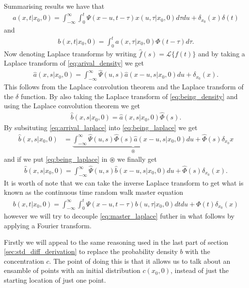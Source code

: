 Summarising results we have that 
\begin{align}
    \label{eq:arival_density}
    a(x,t|x_0, 0) = \int_{-\infty}^\infty \int_0^t \Psi(x-u, t-\tau)x(u,\tau|x_0, 0) d\tau du + \delta_{x_0}(x)\delta(t)
\end{align}
and
\begin{align}
    \label{eq:being_density}
    b(x,t|x_0,0) = \int_0^t a(x,\tau|x_0, 0)\Phi(t-\tau)d\tau. 
\end{align}
Now denoting Laplace transforms by writing $ \hat{f}(s) = \mathcal{L}\{ f(t)  \}  $ and by taking a Laplace transform of \eqref{eq:arival_density} we get 
\begin{align}
    \label{eq:arrival_laplace}
    \hat{a}(x,s|x_0,0) = \int_{-\infty}^\infty \hat{\Psi}(u, s) \hat{a}(x-u,s|x_0,0) du + \delta_{x_0}(x).
\end{align}
This follows from the Laplace convolution theorem and the Laplace transform of the $ \delta $ function.
By also taking the Laplace transform of \eqref{eq:being_density} and using the Laplace convolution theorem we get
\begin{align}
    \label{eq:being_laplace}
    \hat{b}(x,s|x_0, 0) = \hat{a}(x,s|x_0,0)\hat{\Phi}(s).
\end{align}
By subsituting \eqref{eq:arrival_laplace} into \eqref{eq:being_laplace} we get
\begin{align}
    \hat{b}(x,s|x_0,0) &= \underbrace{\int_{-\infty}^\infty \hat{\Psi}(u,s)\hat{\Phi}(s)\hat{a}(x-u,s|x_0,0)du}_{\circledast} + \hat{\Phi}(s) \delta_{x_0}{x}
\end{align}
and if we put \eqref{eq:being_laplace} in $ \circledast $ we finally get
\begin{align}
    \label{eq:master_laplace}
    \hat{b}(x,s|x_0,0) = \int_{-\infty}^\infty \hat{\Psi}(u,s) \hat{b}(x-u,s|x_0,0)du + \hat{\Phi}(s)\delta_{x_0}(x).
\end{align}
It is worth of note that we can take the inverse Laplace transform to get what is known as the continuous time random walk master equation
\begin{align}
    b(x,t|x_0,0) = \int_{-\infty}^\infty \int_0^t \Psi(x-u,t-\tau) b(u,\tau|x_0,0) dtdu + \Phi(t)\delta_{x_0}(x)
\end{align}
however we will try to decouple \eqref{eq:master_laplace} futher in what follows by applying a Fourier transform.

Firstly we will appeal to the same reasoning used in the last part of section \ref{sec:std_diff_derivation} to replace the probability density $ b $ with the concentration $ c $. The point of doing this is that it allows us to talk about an ensamble of points with an initial distribution $ c(x_0,0) $, instead of just the starting location of just one point.


